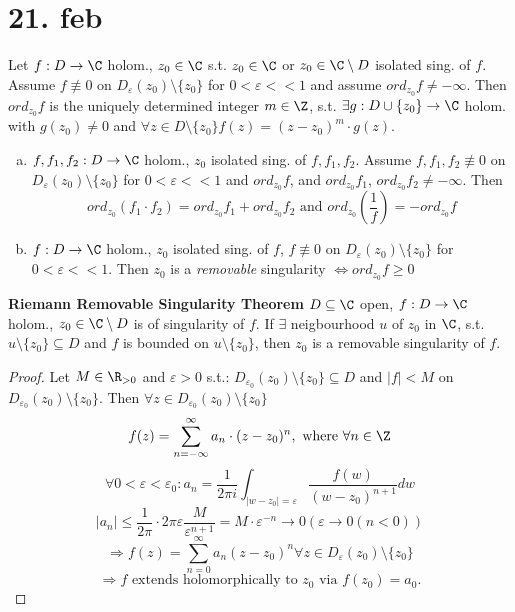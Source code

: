 \section{21. feb}
\begin{lemma}
  Let $f:D \to \C$ holom., $z_0\in \C$ s.t. $z_0\in \C$ or $z_0\in \C\setminus D$ isolated sing. of $f$. Assume $f \not\equiv 0$ on $D_{\varepsilon}(z_0)\setminus\{z_0\}$ for $0< \varepsilon <<1$ and assume $ord_{z_0}f \neq - \infty$. Then $ord_{z_0}f$
  is the uniquely determined integer $m\in \Z$, s.t. $\exists g:D \cup \{z_0\} \to \C$ holom. with $g(z_0)\neq 0$ and $\forall z\in D\setminus\{z_0\} f(z)=(z-z_0)^m \cdot g(z)$.
\end{lemma}
\begin{corollary}
  \begin{enumerate}[(a)]
    \item $f,f_1,f_2 : D\to \C$ holom., $z_0$ isolated sing. of $f,f_1,f_2$. Assume $f,f_1,f_2 \not\equiv 0$ on $D_{\varepsilon}(z_0)\setminus \{z_0\}$ for $0<\varepsilon <<1$ and $ord_{z_0}f$, and $ord_{z_0}f_1$, $ord_{z_0}f_2 \neq -\infty$.
    Then
      $$ord_{z_0}(f_1 \cdot f_2)= ord_{z_0}f_1 + ord_{z_0}f_2 \text{ and } ord_{z_0}(\frac{1}{f})=-ord_{z_0}f$$
    \item $f: D\to\C$ holom., $z_0$ isolated sing. of $f$, $f\not\equiv 0$ on $D_{\varepsilon}(z_0)\setminus \{z_0\}$ for $0<\varepsilon <<1$. Then $z_0$ is a \emph{removable} singularity $\Leftrightarrow ord_{z_0}f \geq 0$
  \end{enumerate}
\end{corollary}

\begin{theorem}
  \textbf{Riemann Removable Singularity Theorem}
  $D\subseteq \C$ open, $f: D\to \C$ holom., $z_0\in \C\setminus D$ is of singularity of $f$. If $\exists $ neigbourhood $u$ of $z_0$ in $\C$, s.t. $u\setminus\{z_0\}\subseteq D$ and $f$ is bounded on $u\setminus\{z_0\}$, then $z_0$ is a removable singularity of $f$.
\end{theorem}
\begin{proof}
  Let $M\in \R_{>0}$ and $\varepsilon >0$ s.t.: $D_{\varepsilon_0}(z_0)\setminus \{z_0\}\subseteq D$ and $|f|<M$ on $D_{\varepsilon_0}(z_0)\setminus \{z_0\}$. Then $\forall z\in D_{\varepsilon_0}(z_0)\setminus \{z_0\}$
    $$f(z)=\sum_{n=-\infty}^{\infty}a_n \cdot(z-z_0)^n, \text{ where } \forall n\in \Z$$
    $$\forall 0<\varepsilon<\varepsilon_0: a_n=\frac{1}{2\pi i} \int_{|w-z_0|=\varepsilon}\frac{f(w)}{(w-z_0)^{n+1}}dw$$
    $$|a_n|\leq \frac{1}{2\pi } \cdot 2\pi \varepsilon \frac{M}{\varepsilon^{n+1}}=M \cdot \varepsilon^{-n} \to 0 (\varepsilon \to 0 (n<0))$$
    $$\Rightarrow f(z)=\sum_{n=0}^{\infty}a_n(z-z_0)^n \forall z\in D_{\varepsilon}(z_0)\setminus \{z_0\}$$
    $$\Rightarrow f \text{ extends holomorphically to }z_0 \text{ via }f(z_0)=a_0.$$
\end{proof}
